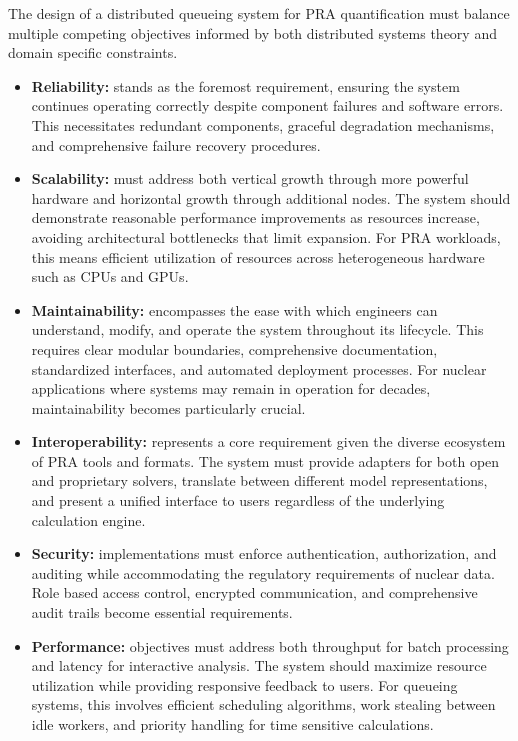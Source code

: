 The design of a distributed queueing system for PRA quantification must balance multiple competing objectives informed by both distributed systems theory and domain specific constraints.
\begin{itemize}
    \item \textbf{Reliability:} stands as the foremost requirement, ensuring the system continues operating correctly despite component failures and software errors. This necessitates redundant components, graceful degradation mechanisms, and comprehensive failure recovery procedures.

    \item \textbf{Scalability:} must address both vertical growth through more powerful hardware and horizontal growth through additional nodes. The system should demonstrate reasonable performance improvements as resources increase, avoiding architectural bottlenecks that limit expansion. For PRA workloads, this means efficient utilization of resources across heterogeneous hardware such as CPUs and GPUs.

    \item \textbf{Maintainability:} encompasses the ease with which engineers can understand, modify, and operate the system throughout its lifecycle. This requires clear modular boundaries, comprehensive documentation, standardized interfaces, and automated deployment processes. For nuclear applications where systems may remain in operation for decades, maintainability becomes particularly crucial.

    \item \textbf{Interoperability:} represents a core requirement given the diverse ecosystem of PRA tools and formats. The system must provide adapters for both open and proprietary solvers, translate between different model representations, and present a unified interface to users regardless of the underlying calculation engine.

    \item \textbf{Security:} implementations must enforce authentication, authorization, and auditing while accommodating the regulatory requirements of nuclear data. Role based access control, encrypted communication, and comprehensive audit trails become essential requirements.

    \item \textbf{Performance:} objectives must address both throughput for batch processing and latency for interactive analysis. The system should maximize resource utilization while providing responsive feedback to users. For queueing systems, this involves efficient scheduling algorithms, work stealing between idle workers, and priority handling for time sensitive calculations.


\end{itemize}
